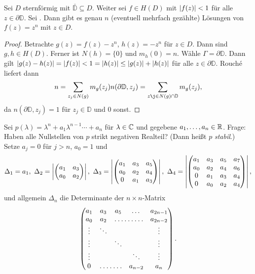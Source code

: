 \documentclass[a4paper,twoside,DIV15,BCOR12mm]{scrbook}
\begin{document}
\begin{bsp}\label{bsp3.19}
  Sei $D$ sternförmig mit $\bar{\mathbb{D}}\subseteq D$. Weiter sei $f\in H(D)$ mit $\left\lvert f(z)\right\lvert<1$ für alle
  $z\in \partial\mathbb{D}$. Sei . Dann gibt es genau $n$ (eventuell mehrfach gezählte) Lösungen von $f(z)=z^n$ mit $z\in D$.
\end{bsp}
\begin{proof}
  Betrachte $g(z)=f(z)-z^n$, $h(z)=-z^n$ für $z\in D$. Dann sind $g, h\in H(D)$. Ferner ist $N(h)=\{0\}$ und $m_h(0)=n$. Wähle
  $\Gamma=\partial\mathbb{D}$. Dann gilt $\left\lvert g(z)-h(z)\right\lvert = \left\lvert f(z)\right\lvert < 1 = \left\lvert h(z)\right\lvert \leq \left\lvert g(z)\right\lvert + \left\lvert h(z)\right\lvert$ für alle
  $z\in\partial\mathbb{D}$. Rouch\'e liefert dann \[ n = \sum_{z_j\in N(g)}{m_g(z_j) n(\partial\mathbb{D}, z_j)} = \sum_{z\j\in
    N(g)\cap\mathbb{D}}{m_g(z_j)}, \] da $n(\partial\mathbb{D}, z_j) = 1$ für $z_j\in\mathbb{D}$ und $0$ sonst.
\end{proof}

Sei $p(\lambda)=\lambda^n+a_1\lambda^{n-1}\dotsb+a_n$ für $\lambda\in\mathbb{C}$ und gegebene $a_1,\dotsc,a_n\in\mathbb{R}$. Frage: Haben alle
Nullstellen von $p$ strikt negativen Realteil? (Dann heißt $p$ \emph{stabil}.) Setze $a_j=0$ für $j>n$, $a_0=1$ und
\[\Delta_1=a_1,\ \Delta_2=\abs{\begin{pmatrix}a_1&a_3\\a_0&a_2\end{pmatrix}},\ 
\Delta_3=\abs{\begin{pmatrix}a_1&a_3&a_5\\a_0&a_2&a_4\\0&a_1&a_3\end{pmatrix}},\ 
\Delta_4=\abs{\begin{pmatrix}a_1&a_3&a_5&a_7\\a_0&a_2&a_4&a_6\\0&a_1&a_3&a_4\\0&a_0&a_2&a_4\end{pmatrix}}, \]
und allgemein $\Delta_n$ die Determinante der $n\times n$-Matrix
\[\begin{pmatrix}
  a_1&a_3&a_5&\dots&a_{2n-1}\\
  a_0&a_2&\hdotsfor{2}&a_{2n-2}\\
  \vdots&\ddots&&&\vdots\\
  \vdots&&\ddots&&\vdots\\
  \vdots&&&\ddots&\vdots\\
  0&\hdotsfor{2}&a_{n-2}&a_n
\end{pmatrix}. \]
\end{document}
